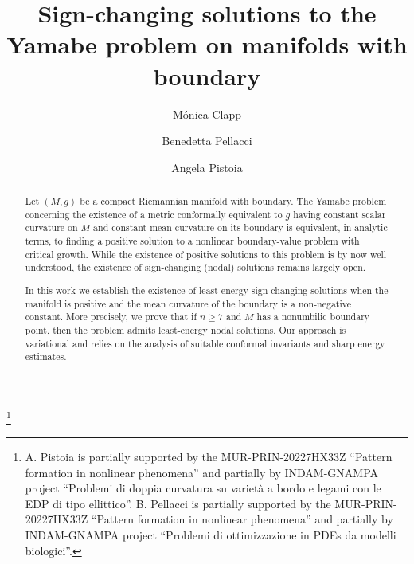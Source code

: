 \documentclass[reqno,11pt,oneside]{amsart}
\numberwithin{equation}{section}
\begin{document}
\title[Sign-changing solutions to the Yamabe problem on manifolds with boundary]
{Sign-changing solutions to the Yamabe problem on manifolds with boundary}





\author{Mónica Clapp}
\address[Mónica Clapp]{Instituto de Matemáticas,
Universidad Nacional Autónoma de México,
Campus Juriquilla,
76230 Querétaro, Qro., Mexico}



	

\author{Benedetta Pellacci}
\address[Benedetta Pellacci]{Dipartimento di Matematica e Fisica,
Universit\`a della Campania ``Luigi Vanvitelli'',
Viale Lincoln 5,
81100 Caserta, Italy}

\author{Angela Pistoia}
\address[Angela Pistoia]{Dipartimento SBAI, Sapienza Universit\`a di Roma,
via Antonio Scarpa 16, 00161 Roma, Italy }




\thanks{A. Pistoia  is partially supported by  the MUR-PRIN-20227HX33Z
  ``Pattern formation in nonlinear phenomena'' and  partially by
  INDAM-GNAMPA project ``Problemi di doppia curvatura su variet\`a a
  bordo e legami con le EDP di tipo ellittico''. 
 B. Pellacci is partially supported by  the MUR-PRIN-20227HX33Z
  ``Pattern formation in nonlinear phenomena'' and  partially by
  INDAM-GNAMPA project ``Problemi di ottimizzazione in PDEs da modelli biologici''.}


 \begin{abstract}
	Let $(M, g)$ be a compact Riemannian manifold with boundary. The Yamabe problem concerning the existence of a metric conformally equivalent to $g$ having constant scalar curvature on $M$ and constant mean curvature on its boundary is equivalent, in analytic terms, to finding a  positive solution to a nonlinear boundary-value problem with critical growth. While the existence of positive solutions to this problem is by now well understood, the existence of sign-changing (nodal) solutions remains largely open.
 
In this work we establish the existence of least-energy sign-changing solutions when the manifold  is positive and the mean curvature of the boundary    is a non-negative constant. More precisely, we prove that if $n\ge7$ and $M$ has a nonumbilic boundary point, then the problem admits least-energy nodal solutions. 
Our approach is variational and relies on the analysis of suitable conformal invariants and sharp energy estimates.



\end{abstract}
\maketitle
\end{document}
